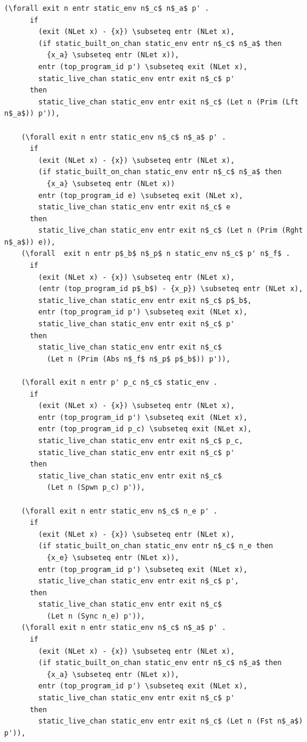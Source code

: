 \documentclass{article}
\begin{document}
\begin{lstlisting}[language=logic, mathescape]
    (\forall exit n entr static_env n$_c$ n$_a$ p' . 
      if
        (exit (NLet x) - {x}) \subseteq entr (NLet x),
        (if static_built_on_chan static_env entr n$_c$ n$_a$ then
          {x_a} \subseteq entr (NLet x)),
        entr (top_program_id p') \subseteq exit (NLet x),
        static_live_chan static_env entr exit n$_c$ p'
      then
        static_live_chan static_env entr exit n$_c$ (Let n (Prim (Lft n$_a$)) p')),

    (\forall exit n entr static_env n$_c$ n$_a$ p' . 
      if
        (exit (NLet x) - {x}) \subseteq entr (NLet x),
        (if static_built_on_chan static_env entr n$_c$ n$_a$ then
          {x_a} \subseteq entr (NLet x))
        entr (top_program_id e) \subseteq exit (NLet x),
        static_live_chan static_env entr exit n$_c$ e
      then
        static_live_chan static_env entr exit n$_c$ (Let n (Prim (Rght n$_a$)) e)),
    (\forall  exit n entr p$_b$ n$_p$ n static_env n$_c$ p' n$_f$ . 
      if
        (exit (NLet x) - {x}) \subseteq entr (NLet x),
        (entr (top_program_id p$_b$) - {x_p}) \subseteq entr (NLet x),
        static_live_chan static_env entr exit n$_c$ p$_b$,
        entr (top_program_id p') \subseteq exit (NLet x),
        static_live_chan static_env entr exit n$_c$ p'
      then
        static_live_chan static_env entr exit n$_c$
          (Let n (Prim (Abs n$_f$ n$_p$ p$_b$)) p')),

    (\forall exit n entr p' p_c n$_c$ static_env .
      if
        (exit (NLet x) - {x}) \subseteq entr (NLet x),
        entr (top_program_id p') \subseteq exit (NLet x),
        entr (top_program_id p_c) \subseteq exit (NLet x),
        static_live_chan static_env entr exit n$_c$ p_c,
        static_live_chan static_env entr exit n$_c$ p'
      then
        static_live_chan static_env entr exit n$_c$
          (Let n (Spwn p_c) p')),

    (\forall exit n entr static_env n$_c$ n_e p' .
      if
        (exit (NLet x) - {x}) \subseteq entr (NLet x),
        (if static_built_on_chan static_env entr n$_c$ n_e then
          {x_e} \subseteq entr (NLet x)),
        entr (top_program_id p') \subseteq exit (NLet x),
        static_live_chan static_env entr exit n$_c$ p',
      then
        static_live_chan static_env entr exit n$_c$
          (Let n (Sync n_e) p')),
    (\forall exit n entr static_env n$_c$ n$_a$ p' .
      if
        (exit (NLet x) - {x}) \subseteq entr (NLet x),
        (if static_built_on_chan static_env entr n$_c$ n$_a$ then
          {x_a} \subseteq entr (NLet x)),
        entr (top_program_id p') \subseteq exit (NLet x),
        static_live_chan static_env entr exit n$_c$ p'
      then
        static_live_chan static_env entr exit n$_c$ (Let n (Fst n$_a$) p')),


\end{lstlisting}
\end{document}
